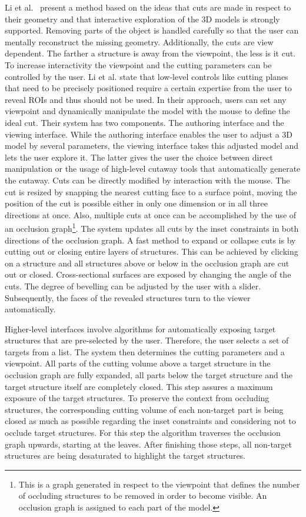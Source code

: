 Li et al.~\cite{jour:interactiveCutaway} present a method based on the ideas that cuts are made in respect to their geometry and that interactive exploration of the 3D models is strongly supported. Removing parts of the object is handled carefully so that the user can mentally reconstruct the missing geometry. Additionally, the cuts are view dependent. The farther a structure is away from the viewpoint, the less is it cut. To increase interactivity the viewpoint and the cutting parameters can be controlled by the user. Li et al. state that low-level controls like cutting planes that need to be precisely positioned require a certain expertise from the user to reveal ROIs and thus should not be used. In their approach, users can set any viewpoint and dynamically manipulate the model with the mouse to define the ideal cut. Their system has two components. The authoring interface and the viewing interface. While the authoring interface enables the user to adjust a 3D model by several parameters, the viewing interface takes this adjusted model and lets the user explore it. The latter gives the user the choice between direct manipulation or the usage of high-level cutaway tools that automatically generate the cutaway. Cuts can be directly modified by interaction with the mouse. The cut is resized by snapping the nearest cutting face to a surface point, moving the position of the cut is possible either in only one dimension or in all three directions at once. Also, multiple cuts at once can be accomplished by the use of an occlusion graph\footnote{This is a graph generated in respect to the viewpoint that defines the number of occluding structures to be removed in order to become visible. An occlusion graph is assigned to each part of the model.}. The system updates all cuts by the inset constraints in both directions of the occlusion graph. A fast method to expand or collapse cuts is by cutting out or closing entire layers of structures. This can be achieved by clicking on a structure and all structures above or below in the occlusion graph are cut out or closed. Cross-sectional surfaces are exposed by changing the angle of the cuts. The degree of bevelling can be adjusted by the user with a slider. Subsequently, the faces of the revealed structures turn to the viewer automatically.

Higher-level interfaces involve algorithms for automatically exposing target structures that are pre-selected by the user. Therefore, the user selects a set of targets from a list. The system then determines the cutting parameters and a viewpoint. All parts of the cutting volume above a target structure in the occlusion graph are fully expanded, all parts below the target structure and the target structure itself are completely closed. This step assures a maximum exposure of the target structures. To preserve the context from occluding structures, the corresponding cutting volume of each non-target part is being closed as much as possible regarding the inset constraints and considering not to occlude target structures. For this step the algorithm traverses the occlusion graph upwards, starting at the leaves. After finishing those steps, all non-target structures are being desaturated to highlight the target structures.

